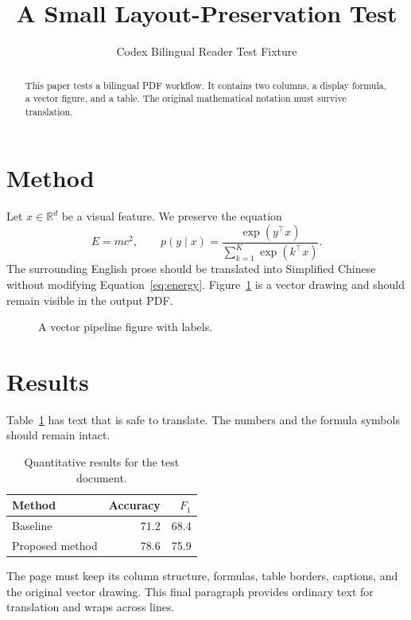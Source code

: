 \documentclass[10pt,twocolumn]{article}
\title{A Small Layout-Preservation Test}
\author{Codex Bilingual Reader Test Fixture}
\date{}
\begin{document}
\maketitle
\begin{abstract}
This paper tests a bilingual PDF workflow. It contains two columns, a display formula, a vector figure, and a table. The original mathematical notation must survive translation.
\end{abstract}
\section{Method}
Let $x \in \mathbb{R}^d$ be a visual feature. We preserve the equation
\begin{equation}
E = mc^2, \qquad p(y \mid x) = \frac{\exp(y^\top x)}{\sum_{k=1}^{K}\exp(k^\top x)}.
\label{eq:energy}
\end{equation}
The surrounding English prose should be translated into Simplified Chinese without modifying Equation~\ref{eq:energy}. Figure~\ref{fig:pipeline} is a vector drawing and should remain visible in the output PDF.

\begin{figure}[t]
\centering
{}
\caption{A vector pipeline figure with labels.}
\label{fig:pipeline}
\end{figure}

\section{Results}
Table~\ref{tab:result} has text that is safe to translate. The numbers and the formula symbols should remain intact.
\begin{table}[h]
\centering
\begin{tabular}{lrr}
\toprule
Method & Accuracy & $F_1$ \\
\midrule
Baseline & 71.2 & 68.4 \\
Proposed method & 78.6 & 75.9 \\
\bottomrule
\end{tabular}
\caption{Quantitative results for the test document.}
\label{tab:result}
\end{table}

The page must keep its column structure, formulas, table borders, captions, and the original vector drawing. This final paragraph provides ordinary text for translation and wraps across lines.
\end{document}
